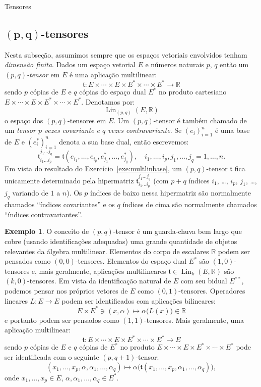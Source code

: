 \documentclass[oneside,11pt]{amsart}
\newcommand{\R}{\mathds R}
\DeclareMathOperator{\Lin}{Lin}
\theoremstyle{remark}\newtheorem{exercise}{Exercício}[section]
\theoremstyle{plain}\newtheorem{teo}{Teorema}[section]
\theoremstyle{plain}\newtheorem{lem}[teo]{Lema}
\theoremstyle{plain}\newtheorem{prop}[teo]{Proposição}
\theoremstyle{definition}\newtheorem{defin}[teo]{Definição}
\theoremstyle{remark}\newtheorem{rem}[teo]{Observação}
\theoremstyle{definition}\newtheorem{example}[teo]{Exemplo}
\numberwithin{equation}{section}
\begin{document}
\begin{section}{Tensores}
\subsection{$\mathbf{(p,q)}$-tensores}\label{sub:pqtensores}
Nesta subseção, assumimos sempre que os espaços vetoriais envolvidos tenham {\em dimensão finita}.
Dados um espaço vetorial $E$ e números naturais $p$, $q$ então um {\em $(p,q)$-tensor\/} em $E$ é uma aplicação multilinear:
\[\mathfrak t:E\times\cdots\times E\times E^*\times\cdots\times E^*\longrightarrow\R\]
sendo $p$ cópias de $E$ e $q$ cópias do espaço dual $E^*$ no produto cartesiano $E\times\cdots\times E\times E^*\times\cdots\times E^*$. Denotamos
por:
\[\Lin_{(p,q)}(E,\R)\]
o espaço dos $(p,q)$-tensores em $E$. Um $(p,q)$-tensor é também chamado de um {\em tensor $p$ vezes covariante e $q$ vezes contravariante}.
Se $(e_i)_{i=1}^n$ é uma base de $E$ e $(e_i^*)_{i=1}^n$ denota a sua base dual, então escrevemos:
\begin{equation}\label{eq:hipermatriz}
\mathfrak t_{i_1\ldots i_p}^{j_1\ldots j_q}=\mathfrak t(e_{i_1},\ldots,e_{i_p},e_{j_1}^*,\ldots,e_{j_q}^*),\quad
i_1,\ldots,i_p,j_1,\ldots,j_q=1,\ldots,n.
\end{equation}
Em vista do resultado do Exercício~\ref{exe:multlinbase}, um $(p,q)$-tensor $\mathfrak t$ fica unicamente determinado pela hipermatriz
$\mathfrak t_{i_1\ldots i_p}^{j_1\ldots j_q}$ (com $p+q$ índices $i_1$, \dots, $i_p$, $j_1$, \dots, $j_q$ variando de $1$ a $n$). Os $p$ índices
de baixo nessa hipermatriz são normalmente chamados ``índices covariantes'' e os $q$ índices de cima são normalmente chamados ``índices contravariantes''.

\begin{example}\label{exa:guardachuva}
O conceito de $(p,q)$-tensor é um guarda-chuva bem largo que cobre (usando identificações adequadas) uma grande quantidade de objetos relevantes
da álgebra multilinear.
Elementos do corpo de escalares $\R$ podem ser pensados como $(0,0)$-tensores. Elementos do espaço dual $E^*$ são $(1,0)$-tensores e,
mais geralmente, aplicações multilineares $\mathfrak t\in\Lin_k(E,\R)$ são $(k,0)$-tensores. Em vista da identificação natural de $E$ com seu
bidual $E^{**}$, podemos pensar nos próprios vetores de $E$ como $(0,1)$-tensores. Operadores lineares $L:E\to E$ podem ser identificados com aplicações
bilineares:
\[E\times E^*\ni(x,\alpha)\longmapsto\alpha\big(L(x)\big)\in\R\]
e portanto podem ser pensados como $(1,1)$-tensores. Mais geralmente, uma aplicação multilinear:
\[\mathfrak t:E\times\cdots\times E\times E^*\times\cdots\times E^*\longrightarrow E\]
sendo $p$ cópias de $E$ e $q$ cópias de $E^*$ no produto $E\times\cdots\times E\times E^*\times\cdots\times E^*$ pode ser identificada com o seguinte
$(p,q+1)$-tensor:
\[(x_1,\ldots,x_p,\alpha,\alpha_1,\ldots,\alpha_q)\longmapsto\alpha\big(\mathfrak t(x_1,\ldots,x_p,\alpha_1,\ldots,\alpha_q)\big),\]
onde $x_1,\ldots,x_p\in E$, $\alpha,\alpha_1,\ldots,\alpha_q\in E^*$.
\end{example}


\end{section}
\end{document}
